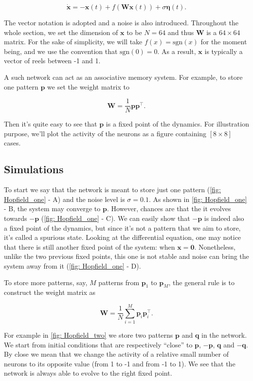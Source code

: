 \[\dot{\mathbf{x}} = -\mathbf{x}(t) + f(\mathbf{Wx}(t)) + 
  \sigma\mathbf{\eta}(t).\]

\noindent
The vector notation is adopted and a noise is also introduced.
Throughout the whole section, we set the dimension of $\mathbf{x}$ to be 
$N=64$ and thus $\mathbf{W}$ is a $64\times64$ matrix. For the sake of 
simplicity, we will take $f(x) = \mathrm{sgn}(x)$ for the moment being, and 
we use the convention that $\mathrm{sgn}(0) = 0$. As a result, $\mathbf{x}$
is typically a vector of reels between -1 and 1.

A such network can act as an associative memory system. For example, to store
one pattern $\mathbf{p}$ we set the weight matrix to 

\[\mathbf{W} = \frac{1}{N} \mathbf{p}\mathbf{p}^{\top}.\]

\noindent
Then it's quite easy to see that $\mathbf{p}$ is a fixed point of the
dynamics. For illustration purpose, we'll plot the activity of the neurons
as a figure containing $[8 \times 8]$ cases.

\subsection{Simulations}

To start we say that the network is meant to store just one pattern 
(\autoref{fig: Hopfield_one} - \textsf{A}) and the
noise level is $\sigma = 0.1$. As shown in \autoref{fig: Hopfield_one} -
\textsf{B}, the system may converge to $\mathbf{p}$. However, chances are 
that the it evolves towards $-\mathbf{p}$ 
(\autoref{fig: Hopfield_one} - \textsf{C}). We can easily show
that $-\mathbf{p}$ is indeed also a fixed point of the dynamics, but since
it's not a pattern that we aim to store, it's called a spurious state.
Looking at the differential equation, one may notice that there is still
another fixed point of the system: when $\mathbf{x} = \mathbf{0}$. 
Nonetheless, unlike the two previous fixed points, this one is not stable
and noise can bring the system away from it (\autoref{fig: Hopfield_one} -
\textsf{D}).

To store more patterns, say, $M$ patterns from $\mathbf{p}_1$ to 
$\mathbf{p}_M$, the general rule is to construct the weight matrix as

\[\mathbf{W} = \frac{1}{N} \sum_{i=1}^M \mathbf{p}_i\mathbf{p}_i^{\top}.\]

\noindent
For example in \autoref{fig: Hopfield_two} we store two patterns $\mathbf{p}$
and $\mathbf{q}$ in the network. We start from 
initial conditions that are respectively ``close'' to $\mathbf{p}$,
$-\mathbf{p}$, $\mathbf{q}$ and $-\mathbf{q}$. By close we mean that we change
the activity of a relative small number of neurons to its opposite value 
(from 1 to -1 and from -1 to 1). We see that the network is always able
to evolve to the right fixed point.

